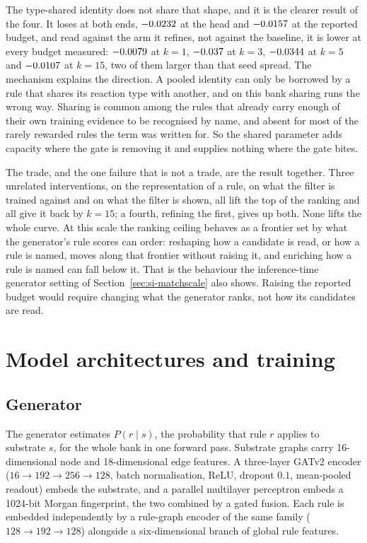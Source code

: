 \documentclass[journal=jcisd8,manuscript=suppinfo,layout=onecolumn]{achemso}
\begin{document}
The type-shared identity does not share that shape, and it is the clearer result of the four. It
loses at both ends, $-0.0232{}$ at the head and $-0.0157{}$ at the
reported budget, and read against the arm it refines, not against the baseline, it is lower
at every budget measured: $-0.0079{}$ at $k=1$,
$-0.037{}$ at $k=3$, $-0.0344{}$ at $k=5$ and
$-0.0107{}$ at $k=15$, two of them larger than that seed spread. The
mechanism explains the direction. A pooled identity can only be borrowed by a rule that shares its
reaction type with another, and on this bank sharing runs the wrong way. Sharing is common among
the rules that already carry enough of their own training evidence to be recognised by name, and
absent for most of the rarely rewarded rules the term was written for. So the shared parameter adds
capacity where the gate is removing it and supplies nothing where the gate bites.

The trade, and the one failure that is not a trade, are the result together. Three unrelated
interventions, on the representation of a rule, on what the filter is trained against and on what
the filter is shown, all lift the top of the ranking and all give it back by $k=15$; a fourth,
refining the first, gives up both. None lifts the whole curve. At this scale the ranking ceiling
behaves as a frontier set by what the generator's rule scores can order: reshaping how a candidate
is read, or how a rule is named, moves along that frontier without raising it, and enriching
how a rule is named can fall below it. That is the behaviour the inference-time generator setting
of Section~\ref{sec:si-matchscale} also shows. Raising the reported budget would require changing
what the generator ranks, not how its candidates are read.

\section{Model architectures and training}
\label{sec:si-arch}

\subsection{Generator}

The generator estimates $P(r \mid s)$, the probability that rule $r$ applies to substrate $s$,
for the whole bank in one forward pass. Substrate graphs carry 16-dimensional node and
18-dimensional edge features. A three-layer GATv2 encoder ($16 \to 192 \to 256 \to 128$, batch
normalisation, ReLU, dropout $0.1$, mean-pooled readout) embeds the substrate, and a parallel
multilayer perceptron embeds a 1024-bit Morgan fingerprint, the two combined by a gated fusion.
Each rule is embedded independently by a rule-graph encoder of the same family
($128 \to 192 \to 128$) alongside a six-dimensional branch of global rule features.
\end{document}
